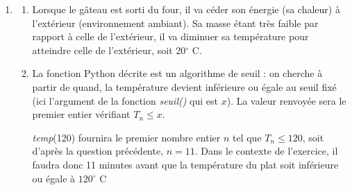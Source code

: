 \documentclass[10pt]{article}
\providecommand{\degres}{\ensuremath{^\circ}}
\providecommand{\N}{\mathbb{N}}
\providecommand{\degres}{{^\circ}}
\begin{document}
\begin{enumerate}
\begin{enumerate}
		Donc $\forall n\in \N$, $u_{n+1}=0,955u_n$ donc la suite $\left(u_n\right)$  est géométrique de raison 0,955 et de premier terme $u_0=T_0-20=160$.
		\item $\forall n\in \N$, $u_n=u_0 \times q^n=160 \times 0,955^n$.
	
	De plus  $\forall n\in \N$, $u_n=T_n-20$ donc $T_n=u_n+20=160\times 0,955^n+20$.
		\item $\displaystyle\lim\limits_{n \rightarrow +\infty} 0,955^n=0$ car $0,955\in ]-1~;~1[$. Donc $\displaystyle\lim\limits_{n \rightarrow +\infty} T_n=20$.
		\item $\begin{gathered}T_n\leqslant 120 \iff 160\times 0,955^n+20\leqslant 120 \iff 160\times 0,955^n \leqslant 120-20 \iff 160\times 0,955^n \leqslant 100 \\
		\iff 0,955^n \leqslant \dfrac{100}{160} \iff 0,955^n \leqslant \dfrac58\end{gathered}$.

		Sachant que la fonction $f:x\mapsto \ln(x)$ est strictement croissante sur $]0~;~+\infty[$, on obtient :

$\ln\left(0,955^n\right)\leqslant \ln\left(\dfrac58\right) \iff  n \times \ln(0,955) \leqslant \ln\left(\dfrac58\right)$. Or $\ln(0,955)<0$ donc,

$n\geqslant \dfrac{\ln\left(\dfrac58\right)}{\ln(0,955)}$. À la calculatrice, $\dfrac{\ln\left(\dfrac58\right)}{\ln(0,955)} \approx 10,21$ donc $n\geqslant 11$.
	\end{enumerate}
\item 
\begin{enumerate}
	\item Lorsque le gâteau est sorti du four, il va céder son énergie (sa chaleur) à l'extérieur (environnement ambiant). Sa masse étant très faible par rapport à celle de l'extérieur, il va diminuer sa température pour atteindre celle de l'extérieur, soit $20 \degres$ C.
	\item La fonction Python décrite est un algorithme de seuil : on cherche à partir de quand, la température devient inférieure ou égale au seuil fixé (ici l'argument de la fonction \textit{seuil()} qui est $x$). La valeur renvoyée sera le premier entier vérifiant $T_n\leqslant x$.

\textit{temp}(120) fournira le premier nombre entier $n$ tel que $T_n\leqslant 120$, soit d'après la question précédente, $n=11$. Dans le contexte de l'exercice, il faudra donc 11 minutes avant que la température du plat soit inférieure ou égale à $120 \degres$ C
\end{enumerate}
\end{enumerate}
\pagebreak
\end{document}
